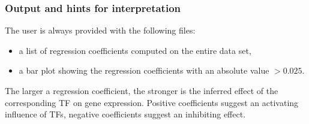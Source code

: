 \documentclass{article}
\begin{document}
\subsubsection{Output and hints for interpretation}
The user is always provided with the following files:
\begin{itemize}
\item a list of regression coefficients computed on the entire data set,
\item a bar plot showing the regression coefficients with an absolute value $> 0.025$.
\end{itemize}
The larger a regression coefficient, the stronger is the inferred effect of the corresponding TF on gene expression. Positive coefficients suggest an activating influence of TFs,
negative coefficients suggest an inhibiting effect. 
\end{document}
